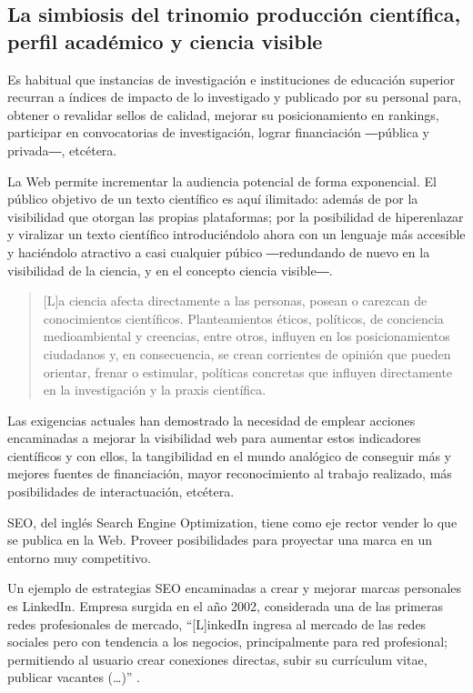 \documentclass{textolivre}
\begin{document}
\subsection{La simbiosis del trinomio producción científica, perfil académico y ciencia visible}\label{sec-simbiosis}
Es habitual que instancias de investigación e instituciones de educación superior recurran a índices de impacto de lo investigado y publicado por su personal para, obtener o revalidar sellos de calidad, mejorar su posicionamiento en rankings, participar en convocatorias de investigación, lograr financiación ―pública y privada―, etcétera.

La Web permite incrementar la audiencia potencial de forma exponencial. El público objetivo de un texto científico es aquí ilimitado: además de por la visibilidad que otorgan las propias plataformas; por la posibilidad de hiperenlazar y viralizar un texto científico introduciéndolo ahora con un lenguaje más accesible y haciéndolo atractivo a casi cualquier púbico ―redundando de nuevo en la visibilidad de la ciencia, y en el concepto ciencia visible―.

\begin{quote}
    [L]a ciencia afecta directamente a las personas, posean o carezcan de conocimientos científicos. Planteamientos éticos, políticos, de conciencia medioambiental y creencias, entre otros, influyen en los posicionamientos ciudadanos y, en consecuencia, se crean corrientes de opinión que pueden orientar, frenar o estimular, políticas concretas que influyen directamente en la investigación y la praxis científica. \cite[p. 270]{garcia_hernandez_rhetoric_2017}
\end{quote}

Las exigencias actuales han demostrado la necesidad de emplear acciones encaminadas a mejorar la visibilidad web para aumentar estos indicadores científicos y con ellos, la tangibilidad en el mundo analógico de conseguir más y mejores fuentes de financiación, mayor reconocimiento al trabajo realizado, más posibilidades de interactuación, etcétera.

SEO, del inglés Search Engine Optimization, tiene como eje rector vender lo que se publica en la Web. Proveer posibilidades para proyectar una marca en un entorno muy competitivo.

Un ejemplo de estrategias SEO encaminadas a crear y mejorar marcas personales es LinkedIn. Empresa surgida en el año 2002, considerada una de las primeras redes profesionales de mercado, “[L]inkedIn ingresa al mercado de las redes sociales pero con tendencia a los negocios, principalmente para red profesional; permitiendo al usuario crear conexiones directas, subir su currículum vitae, publicar vacantes (…)” \cite[p. 39]{hernandez_diaz_reclutamiento_2014}.
\end{document}
